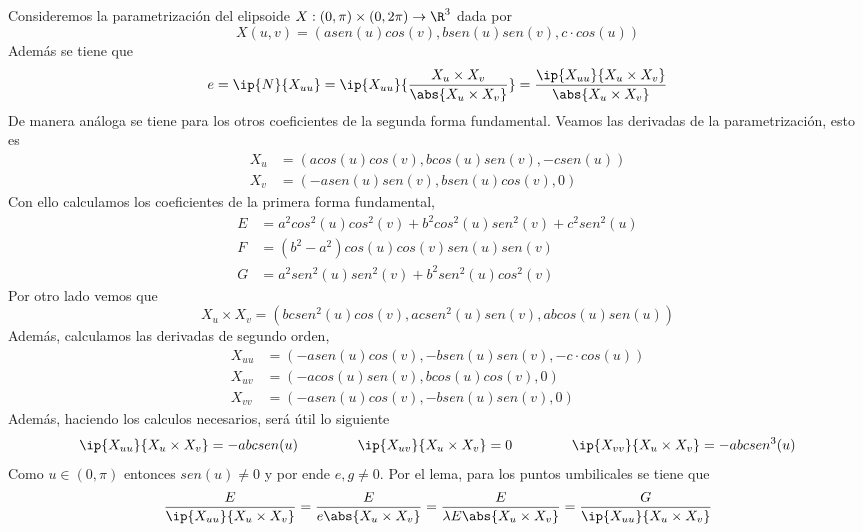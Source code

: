 \documentclass{article}
\begin{document}
\noindent Consideremos la parametrización del elipsoide $X:(0,\pi)\times(0,2\pi)\to\R^{3}$ dada por
\begin{equation*}
    X(u,v)=(asen(u)cos(v),bsen(u)sen(v),c\cdot cos(u))
\end{equation*}
Además se tiene que
\begin{equation*}
    e=\ip{N}{X_{uu}}=\ip{X_{uu}}{\frac{X_{u}\times X_{v}}{\abs{X_{u}\times X_{v}}}}
    =\frac{\ip{X_{uu}}{X_{u}\times X_{v}}}{\abs{X_{u}\times X_{v}}}
\end{equation*}
De manera análoga se tiene para los otros coeficientes de la segunda forma fundamental. Veamos las 
derivadas de la parametrización, esto es
\begin{align*}
    X_{u} &= (acos(u)cos(v),bcos(u)sen(v),-csen(u)) \\
    X_{v} &= (-asen(u)sen(v),bsen(u)cos(v),0)
\end{align*}
Con ello calculamos los coeficientes de la primera forma fundamental,
\begin{align*}
    E &= a^{2}cos^{2}(u)cos^{2}(v)+b^{2}cos^{2}(u)sen^{2}(v)+c^{2}sen^{2}(u) \\
    F &= (b^{2}-a^{2})cos(u)cos(v)sen(u)sen(v) \\
    G &= a^{2}sen^{2}(u)sen^{2}(v)+b^{2}sen^{2}(u)cos^{2}(v)
\end{align*}
Por otro lado vemos que
\begin{equation*}
    X_{u}\times X_{v}=(bcsen^{2}(u)cos(v),acsen^{2}(u)sen(v),abcos(u)sen(u))
\end{equation*}
Además, calculamos las derivadas de segundo orden,
\begin{align*}
    X_{uu} &= (-asen(u)cos(v),-bsen(u)sen(v),-c\cdot cos(u)) \\
    X_{uv} &= (-acos(u)sen(v),bcos(u)cos(v),0) \\
    X_{vv} &= (-asen(u)cos(v),-bsen(u)sen(v),0)
\end{align*}
Además, haciendo los calculos necesarios, será útil lo siguiente
\begin{equation*}
    \ip{X_{uu}}{X_{u}\times X_{v}}=-abcsen(u)\hspace{1.5cm}\ip{X_{uv}}{X_{u}\times X_{v}}=0
    \hspace{1.5cm}\ip{X_{vv}}{X_{u}\times X_{v}}=-abcsen^{3}(u)
\end{equation*}
Como $u\in(0,\pi)$ entonces $sen(u)\neq0$ y por ende $e,g\neq0$. Por el lema, para los puntos 
umbilicales se tiene que
\begin{equation*}
    \frac{E}{\ip{X_{uu}}{X_{u}\times X_{v}}}=\frac{E}{e\abs{X_{u}\times X_{v}}}
    =\frac{E}{\lambda E\abs{X_{u}\times X_{v}}}=\frac{G}{\ip{X_{uu}}{X_{u}\times X_{v}}}
\end{equation*}
\end{document}
